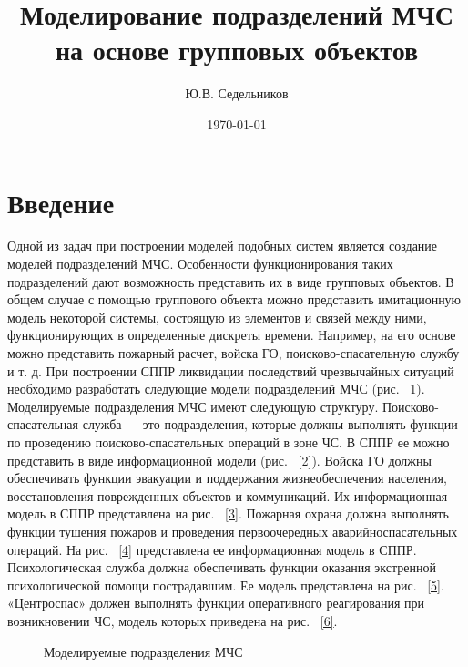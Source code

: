 \documentclass[12pt]{article}
\begin{document}
\title{Моделирование подразделений МЧС на основе
групповых объектов}

\author{Ю.В. Седельников}
\date{\today}
\maketitle


\section{Введение}
Одной из задач при построении моделей подобных
систем является создание моделей подразделений
МЧС. Особенности функционирования таких подразделений дают возможность представить их в виде групповых объектов.
В общем случае с помощью группового объекта
можно представить имитационную модель некоторой
системы, состоящую из элементов и связей между ними, функционирующих в определенные дискреты времени. Например, на его основе можно представить пожарный расчет, войска ГО, поисково-спасательную
службу и т. д.
При построении СППР ликвидации последствий
чрезвычайных ситуаций необходимо разработать следующие модели подразделений МЧС (рис. ~\ref{1}).
Моделируемые подразделения МЧС имеют следующую структуру.
Поисково-спасательная служба — это подразделения, которые должны выполнять функции по проведению поисково-спасательных операций в зоне ЧС.
В СППР ее можно представить в виде информационной модели (рис. ~\ref{2}).
Войска ГО должны обеспечивать функции эвакуации и поддержания жизнеобеспечения населения, восстановления поврежденных объектов и коммуникаций.
Их информационная модель в СППР представлена
на рис. ~\ref{3}.
Пожарная охрана должна выполнять функции тушения пожаров и проведения первоочередных аварийноспасательных операций. На рис. ~\ref{4} представлена ее информационная модель в СППР.
Психологическая служба должна обеспечивать
функции оказания экстренной психологической помощи пострадавшим. Ее модель представлена
на рис. ~\ref{5}.
«Центроспас» должен выполнять функции оперативного реагирования при возникновении ЧС, модель которых приведена на рис. ~\ref{6}.

\begin{figure}
\caption{Моделируемые подразделения МЧС}
\label{1}
\end{figure}
\end{document}
